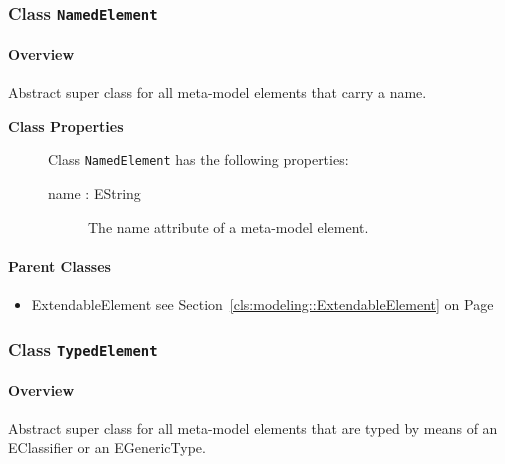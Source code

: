 \subsubsection{\Large{Class \bfseries \texttt{NamedElement}\normalfont}}
\label{cls:modeling::NamedElement} 
\paragraph{Overview}

	
			
Abstract super class for all meta-model elements that carry a name. 	
		
	


\begin{description}

	\item[\textbf{Class Properties}] Class \texttt{NamedElement} has the following properties:
	\begin{description}
\item[name : EString 	]
\hspace{\fill}
\nopagebreak


	
			
The name attribute of a meta-model element.	
		
	
	\end{description}
	
	

\end{description}

\paragraph{Parent Classes}
\begin{itemize}
\item ExtendableElement see Section~\ref{cls:modeling::ExtendableElement} on Page~\pageref{cls:modeling::ExtendableElement}\end{itemize}
\subsubsection{\Large{Class \bfseries \texttt{TypedElement}\normalfont}}
\label{cls:modeling::TypedElement} 
\paragraph{Overview}

	
			
Abstract super class for all meta-model elements that are typed by means of an EClassifier or an EGenericType.	
		
